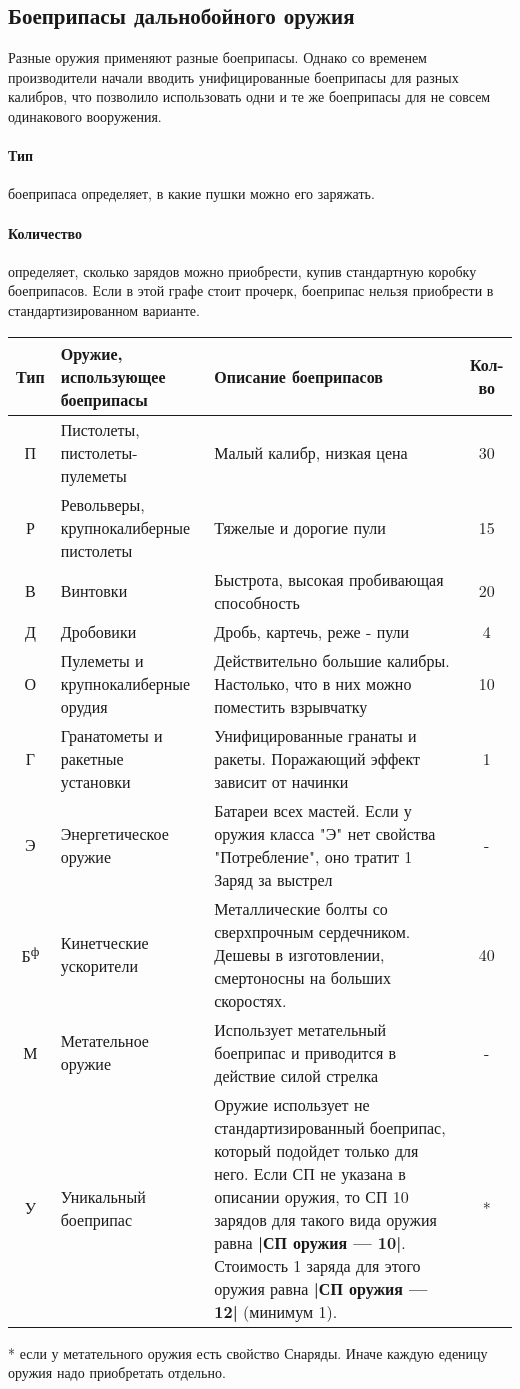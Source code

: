 \subsection{Боеприпасы дальнобойного оружия}
Разные оружия применяют разные боеприпасы. Однако со временем производители начали вводить унифицированные боеприпасы для разных калибров, что позволило использовать одни и те же боеприпасы для не совсем одинакового вооружения.
\paragraph{Тип} боеприпаса определяет, в какие пушки можно его заряжать.
\paragraph{Количество} определяет, сколько зарядов можно приобрести, купив стандартную коробку боеприпасов. Если в этой графе стоит прочерк, боеприпас нельзя приобрести в стандартизированном варианте.
\begin{center}\begin{tabular}{|c|p{3cm}|p{10cm}|c|}
\hline
Тип & Оружие, использующее боеприпасы & Описание боеприпасов & Кол-во\\ \hline
П & Пистолеты, пистолеты-пулеметы & Малый калибр, низкая цена & 30 \\ \hline
Р & Револьверы, крупнокалиберные пистолеты & Тяжелые и дорогие пули & 15 \\ \hline
В & Винтовки & Быстрота, высокая пробивающая способность & 20 \\ \hline
Д & Дробовики & Дробь, картечь, реже - пули & 4 \\ \hline
О & Пулеметы и крупнокалиберные орудия & Действительно большие калибры. Настолько, что в них можно поместить взрывчатку & 10 \\ \hline
Г & Гранатометы и ракетные установки & Унифицированные гранаты и ракеты. Поражающий эффект зависит от начинки & 1 \\ \hline
Э & Энергетическое оружие & Батареи всех мастей. Если у оружия класса "Э" нет свойства "Потребление", оно тратит 1 Заряд за выстрел & - \\ \hline
Б\textsuperscript{ф} & Кинетческие ускорители & Металлические болты со сверхпрочным сердечником. Дешевы в изготовлении, смертоносны на больших скоростях. & 40 \\ \hline
М & Метательное оружие & Использует метательный боеприпас и приводится в действие силой стрелка & - \\ \hline
У & Уникальный боеприпас & Оружие использует не стандартизированный боеприпас, который подойдет только для него. Если СП не указана в описании оружия, то СП 10 зарядов для такого вида оружия равна \textbf{|СП оружия — 10|}. Стоимость 1 заряда для этого оружия равна \textbf{|СП оружия — 12|} (минимум 1). & * \\ \hline
\end{tabular}\end{center}
* если у метательного оружия есть свойство Снаряды. Иначе каждую еденицу оружия надо приобретать отдельно.

